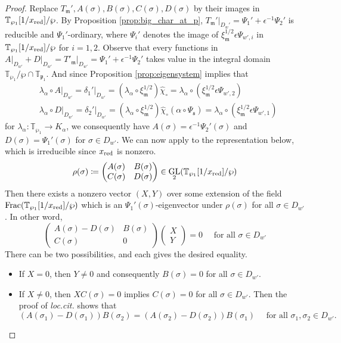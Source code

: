 \documentclass[leqno]{amsart}
\theoremstyle{definition}
\theoremstyle{remark}
\DeclareMathOperator{\GL}{GL}
\newcommand{\fm}{\mathfrak{m}}
\newcommand{\fp}{\mathfrak{p}}
\newcommand{\fs}{\mathfrak{s}}
\newcommand{\xx}{x_\textnormal{red}}
\newcommand{\TT}{\mathbb{T}} %
\begin{document}
\begin{proof}
Replace $T_\fm', A(\sigma),B(\sigma),C(\sigma),D(\sigma)$
by their images in $\TT_{\wp_1}[1/\xx]/\wp$.
By Proposition \ref{prop:big_char_at_p},
$T_\fm'\vert_{D_w'}=\Psi_1'+\epsilon^{-1}\Psi_2'$ is reducible
and $\Psi_1'$-ordinary, where
$\Psi_i'$ denotes the image of 
$\xi_\fm^{1/2}\epsilon\Psi_{w',i}$ in $\TT_{\wp_1}[1/\xx]/\wp$ 
for $i=1,2$.
Observe that every functions in 
$A\vert_{D_{w'}}+D\vert_{D_{w'}}=T'_\fm\vert_{D_{w'}}=
\Psi_1'+\epsilon^{-1}\Psi_2'$
takes value in the integral domain 
$\TT_{\wp_1}/\wp\cap \TT_{\fp_1}$.
And since Proposition \ref{prop:eigensystem} implies that
\begin{align*}
    &\lambda_\alpha\circ A\vert_{D_{w'}}=
    \delta_1'\vert_{D_{w'}}=
    (\lambda_\alpha\circ\xi_\fm^{1/2})\hat{\chi}_\circ=
    \lambda_\alpha\circ (\xi_\fm^{1/2}\epsilon\Psi_{w',2})\\
    &\lambda_\alpha\circ D\vert_{D_{w'}}=
    \delta_2'\vert_{D_{w'}}=
    (\lambda_\alpha\circ\xi_\fm^{1/2})\hat{\chi}_\circ
    (\alpha\circ\Psi_\fs)=
    \lambda_\alpha\circ (\xi_\fm^{1/2}\epsilon\Psi_{w',1})
\end{align*}
for $\lambda_\alpha\colon \TT_{\wp_1}\to K_\alpha$,
we consequently have
$A(\sigma)=\epsilon^{-1}\Psi_2'(\sigma)$ and
$D(\sigma)=\Psi_1'(\sigma)$ for $\sigma\in D_{w'}$.
We can now apply \cite[Lem 5.3.3]{pan} to the representation below,
which is irreducible since $\xx$ is nonzero.
\[
    \rho(\sigma)\coloneqq
    \begin{pmatrix}
        A(\sigma)& B(\sigma)\\
        C(\sigma) & D(\sigma)
    \end{pmatrix}
    \in \GL_2(\TT_{\wp_1}[1/\xx]/\wp)
\]
Then there exists a nonzero vector $(X,Y)$
over some extension of 
the field $\textnormal{Frac}(\TT_{\wp_1}[1/\xx]/\wp)$
which is an $\Psi_1'(\sigma)$-eigenvector 
under $\rho(\sigma)$ for all $\sigma\in D_{w'}$.
In other word,
\[
    \begin{pmatrix}
        A(\sigma)-D(\sigma) & B(\sigma)\\
        C(\sigma) &0
    \end{pmatrix}
    \begin{pmatrix}
        X\\Y
    \end{pmatrix}=0
    \quad \text{ for all } \sigma\in D_{w'}
\]
There can be two possibilities,
and each gives the desired equality.
\begin{itemize}
    \item If $X=0$, then $Y\neq 0$ and consequently
    $B(\sigma)=0$ for all $\sigma\in D_{w'}$.
    \item If $X\neq 0$, then $XC(\sigma)=0$
    implies $C(\sigma)=0$ for all $\sigma\in D_{w'}$.
    Then the proof of \textit{loc.cit.} shows that 
    \[
        (A(\sigma_1)-D(\sigma_1))B(\sigma_2)=
        (A(\sigma_2)-D(\sigma_2))B(\sigma_1)\quad
        \text{ for all  }\sigma_1,\sigma_2\in D_{w'}.
    \]
\end{itemize}



\end{proof}
\end{document}
